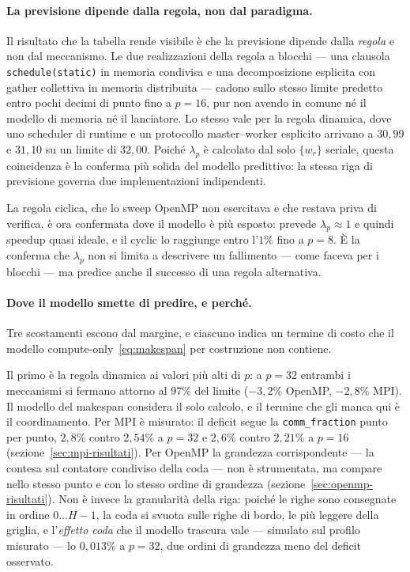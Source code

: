 \paragraph{La previsione dipende dalla regola, non dal paradigma.}
Il risultato che la tabella rende visibile è che la previsione dipende dalla
\emph{regola} e non dal meccanismo. Le due realizzazioni della regola a blocchi
--- una clausola \texttt{schedule(static)} in memoria condivisa e una
decomposizione esplicita con gather collettiva in memoria distribuita --- cadono
sullo stesso limite predetto entro pochi decimi di punto fino a $p=16$, pur non
avendo in comune né il modello di memoria né il lanciatore. Lo stesso vale per la regola dinamica, dove uno scheduler di runtime
e un protocollo master--worker esplicito arrivano a $30{,}99$ e $31{,}10$ su un
limite di $32{,}00$. Poiché $\lambda_p$ è calcolato dal solo $\{w_r\}$ seriale,
questa coincidenza è la conferma più solida del modello predittivo: la stessa riga di previsione governa due implementazioni indipendenti.

La regola ciclica, che lo sweep OpenMP non esercitava e che restava priva di
verifica, è ora confermata dove il modello è più esposto: prevede
$\lambda_p \approx 1$ e quindi speedup quasi ideale, e il cyclic lo raggiunge
entro l'$1\%$ fino a $p=8$. È la conferma che $\lambda_p$ non si limita a
descrivere un fallimento --- come faceva per i blocchi --- ma predice anche il
successo di una regola alternativa.

\paragraph{Dove il modello smette di predire, e perché.}
Tre scostamenti escono dal margine, e ciascuno indica un termine di costo che il
modello compute-only~\eqref{eq:makespan} per costruzione non contiene.

Il primo è la regola dinamica ai valori più alti di $p$: a $p=32$ entrambi i
meccanismi si fermano attorno al $97\%$ del limite ($-3{,}2\%$ OpenMP, $-2{,}8\%$
MPI). Il modello del makespan considera il solo calcolo, e il termine che gli
manca qui è il coordinamento. Per MPI è misurato: il deficit segue la
\texttt{comm\_fraction} punto per punto, $2{,}8\%$ contro $2{,}54\%$ a $p=32$ e
$2{,}6\%$ contro $2{,}21\%$ a $p=16$ (sezione~\ref{sec:mpi-risultati}). Per
OpenMP la grandezza corrispondente --- la contesa sul contatore condiviso della
coda --- non è strumentata, ma compare nello stesso punto e con lo stesso ordine
di grandezza (sezione~\ref{sec:openmp-risultati}). Non è invece la granularità
della riga: poiché le righe sono consegnate in ordine $0 \ldots H-1$, la coda si
svuota sulle righe di bordo, le più leggere della griglia, e l'\emph{effetto
coda} che il modello trascura vale --- simulato sul profilo misurato --- lo
$0{,}013\%$ a $p=32$, due ordini di grandezza meno del deficit osservato.

